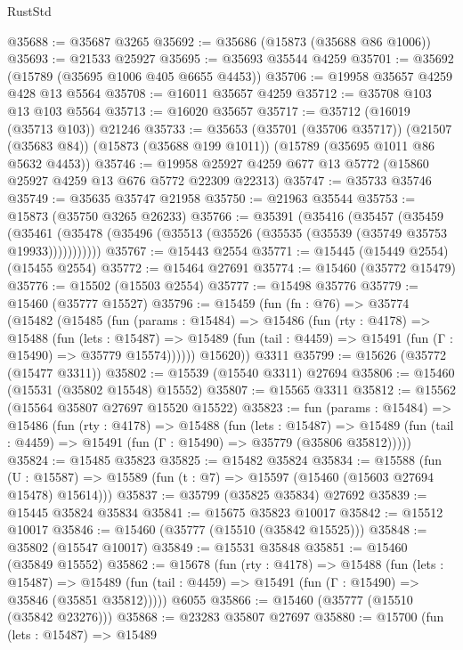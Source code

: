 \begin{lexlean}{RustStd}
\begin{coremodule}
@35688 := @35687 @3265
@35692 := @35686 (@15873 (@35688 @86 @1006))
@35693 := @21533 @25927
@35695 := @35693 @35544 @4259
@35701 := @35692 (@15789 (@35695 @1006 @405 @6655 @4453))
@35706 := @19958 @35657 @4259 @428 @13 @5564
@35708 := @16011 @35657 @4259
@35712 := @35708 @103 @13 @103 @5564
@35713 := @16020 @35657
@35717 := @35712 (@16019 (@35713 @103)) @21246
@35733 := @35653
    (@35701 (@35706 @35717))
    (@21507 (@35683 @84))
    (@15873 (@35688 @199 @1011))
    (@15789 (@35695 @1011 @86 @5632 @4453))
@35746 := @19958 @25927 @4259 @677 @13 @5772 (@15860 @25927 @4259 @13 @676 @5772 @22309 @22313)
@35747 := @35733 @35746
@35749 := @35635 @35747 @21958
@35750 := @21963 @35544
@35753 := @15873 (@35750 @3265 @26233)
@35766 := @35391
    (@35416
      (@35457
        (@35459
          (@35461 (@35478 (@35496 (@35513 (@35526 (@35535 (@35539 (@35749 @35753 @19933)))))))))))
@35767 := @15443 @2554
@35771 := @15445 (@15449 @2554) (@15455 @2554)
@35772 := @15464 @27691
@35774 := @15460 (@35772 @15479)
@35776 := @15502 (@15503 @2554)
@35777 := @15498 @35776
@35779 := @15460 (@35777 @15527)
@35796 := @15459
    (fun (fn : @76) =>
    @35774
      (@15482
        (@15485
          (fun (params : @15484) =>
          @15486
            (fun (rty : @4178) =>
            @15488
              (fun (lets : @15487) =>
              @15489 (fun (tail : @4459) => @15491 (fun (Γ : @15490) => @35779 @15574))))))
        @15620))
    @3311
@35799 := @15626 (@35772 (@15477 @3311))
@35802 := @15539 (@15540 @3311) @27694
@35806 := @15460 (@15531 (@35802 @15548) @15552)
@35807 := @15565 @3311
@35812 := @15562 (@15564 @35807 @27697 @15520 @15522)
@35823 := fun (params : @15484) =>
  @15486
    (fun (rty : @4178) =>
    @15488
      (fun (lets : @15487) =>
      @15489 (fun (tail : @4459) => @15491 (fun (Γ : @15490) => @35779 (@35806 @35812)))))
@35824 := @15485 @35823
@35825 := @15482 @35824
@35834 := @15588
    (fun (U : @15587) => @15589 (fun (t : @7) => @15597 (@15460 (@15603 @27694 @15478) @15614)))
@35837 := @35799 (@35825 @35834) @27692
@35839 := @15445 @35824 @35834
@35841 := @15675 @35823 @10017
@35842 := @15512 @10017
@35846 := @15460 (@35777 (@15510 (@35842 @15525)))
@35848 := @35802 (@15547 @10017)
@35849 := @15531 @35848
@35851 := @15460 (@35849 @15552)
@35862 := @15678
    (fun (rty : @4178) =>
    @15488
      (fun (lets : @15487) =>
      @15489 (fun (tail : @4459) => @15491 (fun (Γ : @15490) => @35846 (@35851 @35812)))))
    @6055
@35866 := @15460 (@35777 (@15510 (@35842 @23276)))
@35868 := @23283 @35807 @27697
@35880 := @15700
    (fun (lets : @15487) =>
    @15489

\end{coremodule}
\end{lexlean}
